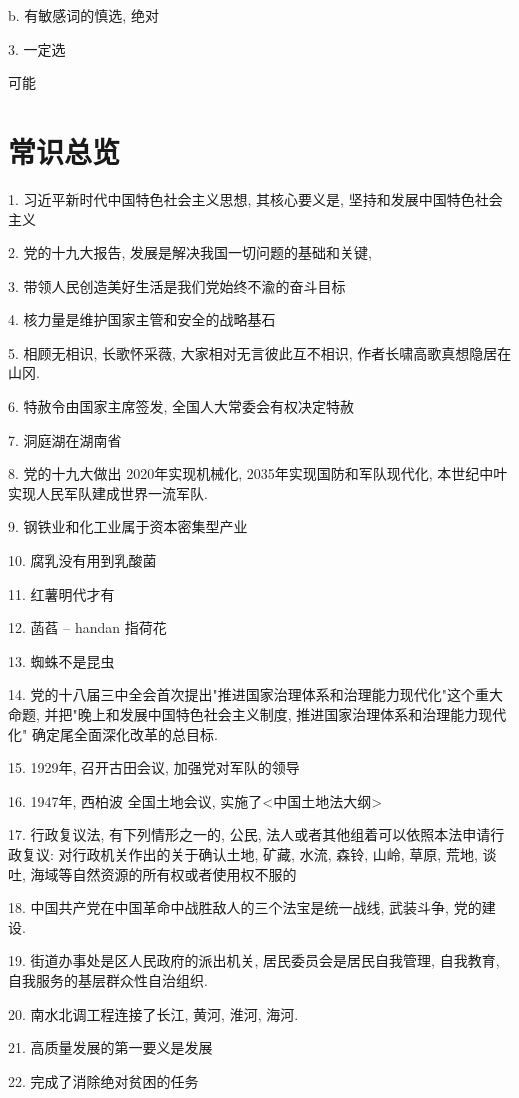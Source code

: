 \documentclass[UTF8]{ctexart}
\begin{document}
b. 有敏感词的慎选, 绝对

3. 一定选

可能
\section{常识总览}

1. 习近平新时代中国特色社会主义思想, 其核心要义是, 坚持和发展中国特色社会主义

2. 党的十九大报告, 发展是解决我国一切问题的基础和关键,

3. 带领人民创造美好生活是我们党始终不渝的奋斗目标

4. 核力量是维护国家主管和安全的战略基石

5. 相顾无相识, 长歌怀采薇, 大家相对无言彼此互不相识, 作者长啸高歌真想隐居在山冈.

6. 特赦令由国家主席签发, 全国人大常委会有权决定特赦

7. 洞庭湖在湖南省

8. 党的十九大做出 2020年实现机械化, 2035年实现国防和军队现代化, 本世纪中叶实现人民军队建成世界一流军队.

9. 钢铁业和化工业属于资本密集型产业

10. 腐乳没有用到乳酸菌

11. 红薯明代才有

12. 菡萏  -- handan 指荷花

13. 蜘蛛不是昆虫

14. 党的十八届三中全会首次提出"推进国家治理体系和治理能力现代化"这个重大命题, 并把"晚上和发展中国特色社会主义制度, 推进国家治理体系和治理能力现代化" 确定尾全面深化改革的总目标.

15. 1929年, 召开古田会议, 加强党对军队的领导

16. 1947年, 西柏波 全国土地会议,  实施了<中国土地法大纲>

17. 行政复议法, 有下列情形之一的, 公民, 法人或者其他组着可以依照本法申请行政复议: 对行政机关作出的关于确认土地, 矿藏, 水流, 森铃, 山岭, 草原, 荒地, 谈吐, 海域等自然资源的所有权或者使用权不服的

18.  中国共产党在中国革命中战胜敌人的三个法宝是统一战线, 武装斗争, 党的建设.

19. 街道办事处是区人民政府的派出机关, 居民委员会是居民自我管理, 自我教育, 自我服务的基层群众性自治组织.

20. 南水北调工程连接了长江, 黄河, 淮河, 海河.

21. 高质量发展的第一要义是发展

22. 完成了消除绝对贫困的任务
\end{document}
